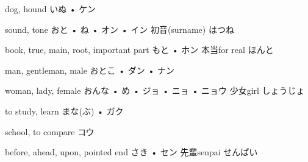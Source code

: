 



\setcounter{cardnum}{41}

		{dog, hound}
		{いぬ • ケン}
		{}{}
		{}{}
		{}{}
		{}{}
		{}{}

		{sound, tone}
		{おと • ね • オン • イン}
		{初音}{(surname) はつね}
		{}{}
		{}{}
		{}{}
		{}{}

		{book, true, main, root, important part}
		{もと • ホン}
		{本当}{for real ほんと}
		{}{}
		{}{}
		{}{}
		{}{}

		{man, gentleman, male}
		{おとこ • ダン • ナン}
		{}{}
		{}{}
		{}{}
		{}{}
		{}{}

		{woman, lady, female}
		{おんな • め • ジョ • ニョ • ニョウ}
		{少女}{girl しょうじょ}
		{}{}
		{}{}
		{}{}
		{}{}

		{to study, learn}
		{まな(ぶ) • ガク}
		{}{}
		{}{}
		{}{}
		{}{}
		{}{}

		{school, to compare}
		{コウ}
		{}{}
		{}{}
		{}{}
		{}{}
		{}{}

		{before, ahead, upon, pointed end}
		{さき • セン}
		{先輩}{senpai せんぱい}
		{}{}
		{}{}
		{}{}
		{}{}

